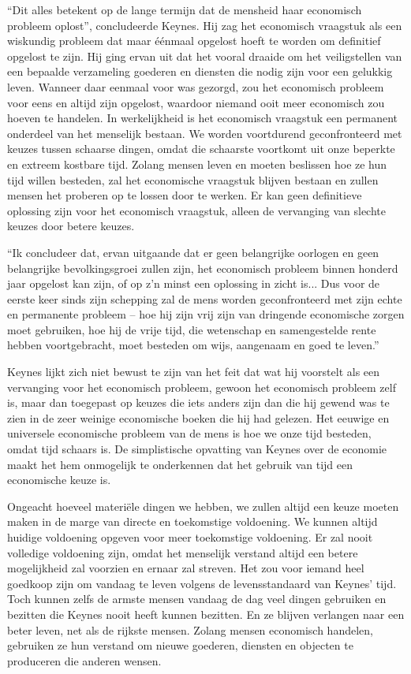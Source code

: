 \enquote{Dit alles betekent op de lange termijn dat de mensheid haar economisch
probleem oplost}, concludeerde Keynes. Hij zag het economisch vraagstuk
als een wiskundig probleem dat maar éénmaal opgelost hoeft te worden om
definitief opgelost te zijn. Hij ging ervan uit dat het vooral draaide
om het veiligstellen van een bepaalde verzameling goederen en diensten
die nodig zijn voor een gelukkig leven. Wanneer daar eenmaal voor was
gezorgd, zou het economisch probleem voor eens en altijd zijn opgelost,
waardoor niemand ooit meer economisch zou hoeven te handelen. In
werkelijkheid is het economisch vraagstuk een permanent onderdeel van
het menselijk bestaan. We worden voortdurend geconfronteerd met keuzes
tussen schaarse dingen, omdat die schaarste voortkomt uit onze beperkte
en extreem kostbare tijd. Zolang mensen leven en moeten beslissen hoe ze
hun tijd willen besteden, zal het economische vraagstuk blijven bestaan
en zullen mensen het proberen op te lossen door te werken. Er kan geen
definitieve oplossing zijn voor het economisch vraagstuk, alleen de
vervanging van slechte keuzes door betere keuzes.

\enquote{Ik concludeer dat, ervan uitgaande dat er geen belangrijke oorlogen en
geen belangrijke bevolkingsgroei zullen zijn, het economisch probleem
binnen honderd jaar opgelost kan zijn, of op z'n minst
een oplossing in zicht is... Dus voor de eerste keer sinds zijn
schepping zal de mens worden geconfronteerd met zijn echte en permanente
probleem -- hoe hij zijn vrij zijn van dringende economische zorgen moet
gebruiken, hoe hij de vrije tijd, die wetenschap en samengestelde rente
hebben voortgebracht, moet besteden om wijs, aangenaam en goed te
leven.}\autocite{45}

Keynes lijkt zich niet bewust te zijn van het feit dat wat hij voorstelt
als een vervanging voor het economisch probleem, gewoon het economisch
probleem zelf is, maar dan toegepast op keuzes die iets anders zijn dan
die hij gewend was te zien in de zeer weinige economische boeken die hij
had gelezen. Het eeuwige en universele economische probleem van de mens
is hoe we onze tijd besteden, omdat tijd schaars is. De simplistische
opvatting van Keynes over de economie maakt het hem onmogelijk te
onderkennen dat het gebruik van tijd een economische keuze is.

Ongeacht hoeveel materiële dingen we hebben, we zullen altijd een keuze
moeten maken in de marge van directe en toekomstige voldoening. We
kunnen altijd huidige voldoening opgeven voor meer toekomstige
voldoening. Er zal nooit volledige voldoening zijn, omdat het menselijk
verstand altijd een betere mogelijkheid zal voorzien en ernaar zal
streven. Het zou voor iemand heel goedkoop zijn om vandaag te leven
volgens de levensstandaard van Keynes' tijd. Toch
kunnen zelfs de armste mensen vandaag de dag veel dingen gebruiken en
bezitten die Keynes nooit heeft kunnen bezitten. En ze blijven verlangen
naar een beter leven, net als de rijkste mensen. Zolang mensen
economisch handelen, gebruiken ze hun verstand om nieuwe goederen,
diensten en objecten te produceren die anderen wensen.

